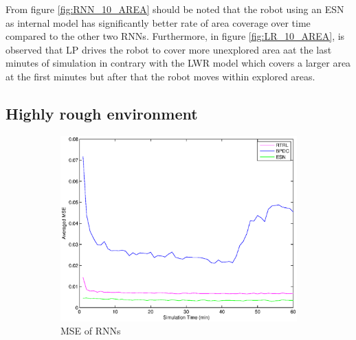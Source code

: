\documentclass[msc,ai,logo]{infthesis}
\begin{document}
From figure \ref{fig:RNN_10_AREA} should be noted that the robot using an ESN as internal model has significantly better rate of area coverage over time compared to the other two RNNs. Furthermore, in figure \ref{fig:LR_10_AREA}, is observed that LP drives the robot to cover more unexplored area aat the last minutes of simulation in contrary with the LWR model which covers a larger area at the first minutes but after that the robot moves within explored areas.    


\subsection{Highly rough environment}


\begin{figure}[H]
        \centering
        \begin{subfigure}[b]{0.5\textwidth}
                \centering
                \includegraphics[width=\textwidth]{RNN_15_MSE.eps}
                \caption{MSE of RNNs}
              \label{fig:RNN_15_MSE}  
        \end{subfigure}%
        ~ %
        \begin{subfigure}[b]{0.5\textwidth}
                \centering

\end{subfigure}
\end{figure}
\end{document}
